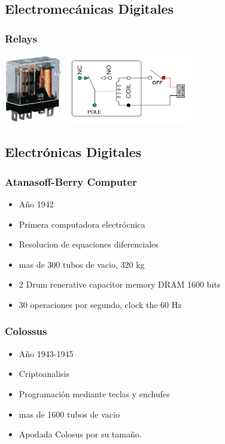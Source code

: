 \documentclass{beamer}
\begin{document}
\subsection{Electromecánicas Digitales}
\begin{frame}
\frametitle{Relays}
\begin{center}
\hfill
\includegraphics[height=3cm]{relay-imagen.jpg}
\hfill
\includegraphics[height=3cm]{relay-diagrama.png}
\end{center}
\end{frame}

\subsection{Electrónicas Digitales}
\begin{frame}
\frametitle{Atanasoff-Berry Computer}
\begin{itemize}
	\item Año 1942
	\item Primera computadora electrócnica 
	\item Resolucion de equaciones diferenciales
	\item mas de 300 tubos de vacio, 320 kg
	\item 2 Drum renerative capacitor memory DRAM 1600 bits
	\item 30 operaciones por segundo, clock the 60 Hz
\end{itemize}
\end{frame}

\begin{frame}
\frametitle{Colossus}
\begin{itemize}
	\item Año 1943-1945
	\item Criptoanalisis
	\item Programación mediante teclas y enchufes
	\item mas de 1600 tubos de vacio
	\item Apodada Colosus por su tamaño.
\end{itemize}
\end{frame}
\end{document}
